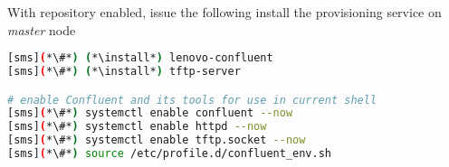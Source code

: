 With \Confluent{} repository enabled, issue the following install the provisioning
service on {\em master} node

\begin{lstlisting}[language=bash,keywords={}]
[sms](*\#*) (*\install*) lenovo-confluent
[sms](*\#*) (*\install*) tftp-server

# enable Confluent and its tools for use in current shell
[sms](*\#*) systemctl enable confluent --now
[sms](*\#*) systemctl enable httpd --now
[sms](*\#*) systemctl enable tftp.socket --now
[sms](*\#*) source /etc/profile.d/confluent_env.sh
\end{lstlisting}
